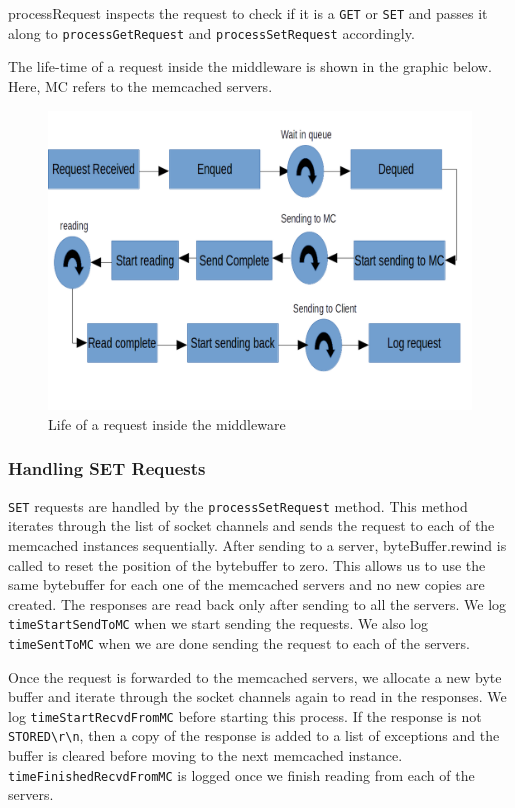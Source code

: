 \documentclass[11pt,a4paper]{article}
\begin{document}
processRequest inspects the request to check if it is a \texttt{GET} or \texttt{SET} and passes it along to \texttt{processGetRequest} and \texttt{processSetRequest} accordingly.

The life-time of a request inside the middleware is shown in the graphic below. Here, MC refers to the memcached servers.
	\begin{figure}
		\caption{Life of a request inside the middleware}
		\centering
		\includegraphics[scale=0.5]{images/1_life-of-a-request.png}
	\end{figure}


	\subsubsection{Handling SET Requests}
	\texttt{SET} requests are handled by the \texttt{processSetRequest} method. This method iterates through the list of socket channels and sends the request to each of the memcached instances sequentially. After sending to a server, byteBuffer.rewind is called to reset the position of the bytebuffer to zero. This allows us to use the same bytebuffer for each one of the memcached servers and no new copies are created. The responses are read back only after sending to all the servers. We log \texttt{timeStartSendToMC} when we start sending the requests. We also log \texttt{timeSentToMC} when we are done sending the request to each of the servers.
	
	Once the request is forwarded to the memcached servers, we allocate a new byte buffer and iterate through the socket channels again to read in the responses. We log \texttt{timeStartRecvdFromMC} before starting this process. If the response is not \texttt{STORED\textbackslash r\textbackslash n}, then a copy of the response is added to a list of exceptions and the buffer is cleared before moving to the next memcached instance. \texttt{timeFinishedRecvdFromMC} is logged once we finish reading from each of the servers.
	
\end{document}
